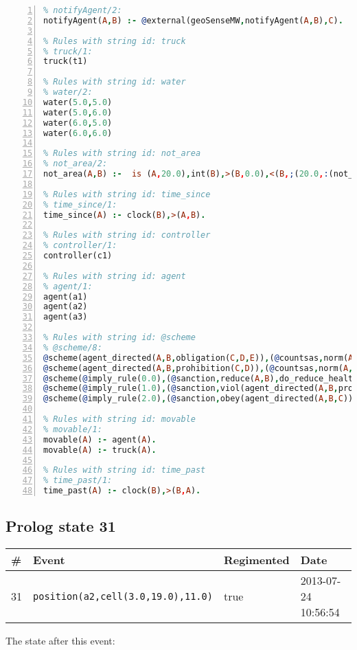 \documentclass[11pt]{article}\usepackage[utf8]{inputenc}\usepackage{geometry}
\begin{document}
\begin{lstlisting}[language=Prolog, numbers=left]
% Rules with string id: notifyAgent
% notifyAgent/2:
notifyAgent(A,B) :- @external(geoSenseMW,notifyAgent(A,B),C).

% Rules with string id: truck
% truck/1:
truck(t1)

% Rules with string id: water
% water/2:
water(5.0,5.0)
water(5.0,6.0)
water(6.0,5.0)
water(6.0,6.0)

% Rules with string id: not_area
% not_area/2:
not_area(A,B) :-  is (A,20.0),int(B),>(B,0.0),<(B,;(20.0,:(not_area(A,B), is (-(B),20.0)))),int(A),>(A,0.0),<(A,;(20.0,:(area(A,B),-(int(A))))),int(B),>(A,0.0),>(B,0.0),<(A,21.0),<(B,21.0).

% Rules with string id: time_since
% time_since/1:
time_since(A) :- clock(B),>(A,B).

% Rules with string id: controller
% controller/1:
controller(c1)

% Rules with string id: agent
% agent/1:
agent(a1)
agent(a2)
agent(a3)

% Rules with string id: @scheme
% @scheme/8:
@scheme(agent_directed(A,B,obligation(C,D,E)),(@countsas,norm(A,B,F,obligation(C,D,E)),F),false,(listTrue(C)),(time_past(D)),false,[plus(viol(agent_directed(A,B,obligation(C,D,E))))|[]],[plus(obey(agent_directed(A,B,obligation(C,D,E))))|[]])
@scheme(agent_directed(A,B,prohibition(C,D)),(@countsas,norm(A,B,E,prohibition(C,D)),E),(listTrue(C)),false,(false),false,[plus(viol(agent_directed(A,B,prohibition(C,D))))|[]],[plus(obey(agent_directed(A,B,prohibition(C,D))))|[]])
@scheme(@imply_rule(0.0),(@sanction,reduce(A,B),do_reduce_health(A,B),notifyAgent(A,changed(status))),true,false,false,false,[min(reduce(A,B))|[]],[])
@scheme(@imply_rule(1.0),(@sanction,viol(agent_directed(A,B,prohibition(C,D))),do_sanction(D)),true,false,false,false,[min(viol(agent_directed(A,B,prohibition(C,D))))|[]],[])
@scheme(@imply_rule(2.0),(@sanction,obey(agent_directed(A,B,C))),true,false,false,false,[min(obey(agent_directed(A,B,C)))|[]],[])

% Rules with string id: movable
% movable/1:
movable(A) :- agent(A).
movable(A) :- truck(A).

% Rules with string id: time_past
% time_past/1:
time_past(A) :- clock(B),>(B,A).

\end{lstlisting}
\clearpage 
\subsection{Prolog state 31}
\begin{table}[ht]
\centering 
\begin{tabular}{l l l l} 
\textbf{\#} & \textbf{Event} & \textbf{Regimented} & \textbf{Date} \\ [0.5ex] 
\hline
31&\texttt{position(a2,cell(3.0,19.0),11.0)}&true&2013-07-24 10:56:54\\ [1ex] \hline\end{tabular}
\end{table}
The state after this event:
\end{document}
